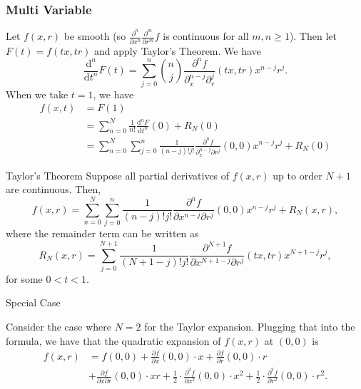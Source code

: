 \documentclass[class=article, crop=false]{standalone}
\begin{document}
  \subsubsection{Multi Variable}
  Let $f(x, r)$ be smooth (so $\displaystyle\frac{\partial^n}{\partial x^n} \frac{\partial^m}{\partial r^m}f$ is continuous for all $m, n \geq 1$). Then let $F(t) = f(tx, tr)$ and apply Taylor's Theorem. We have
  \[
    \frac{\mathrm{d}^n}{\mathrm{d}t^n} F(t) = \sum_{j=0}^{n} \binom{n}{j} \frac{\partial^nf}{\partial_x^{n - j}\partial_r^j}(tx, tr)x^{n - j}r^j.
  \]
  When we take $t = 1$, we have
  \begin{align*}
    f(x, t) &= F(1) \\
            &= \sum_{n=0}^{N} \frac{1}{n!} \frac{\mathrm{d}^nF}{\mathrm{d}t^n}(0) + R_N(0) \\
            &= \sum_{n=0}^{N} \sum_{j=0}^{n} \frac{1}{(n - j)!j!} \frac{\partial^nf}{\partial_x^{n - j}\partial r^j}(0, 0)x^{n - j}r^j + R_N(0)
  \end{align*}
  \begin{theorem}{Taylor's Theorem}
    Suppose all partial derivatives of $f(x, r)$ up to order $N + 1$ are continuous. Then,
    \[
      f(x, r) = \sum_{n=0}^{N} \sum_{j=0}^{n} \frac{1}{(n - j)!j!} \frac{\partial^nf}{\partial x^{n - j}\partial r^j}(0, 0) x^{n - j}r^j + R_N(x, r),
    \]
    where the remainder term can be written as
    \[
      R_N(x, r) = \sum_{j=0}^{N + 1} \frac{1}{(N + 1 - j)!j!} \frac{\partial^{N + 1}f}{\partial x^{N + 1 - j}\partial r^j}(tx, tr) x^{N + 1 - j}r^j,
    \]
    for some $0 < t < 1$.
  \end{theorem}
  \begin{example}{Special Case} \par
    Consider the case where $N = 2$ for the Taylor expansion. Plugging that into the formula, we have that the quadratic expansion of $f(x, r)$ at $(0, 0)$ is
    \begin{align*}
      f(x, r) &= f(0, 0) + \frac{\partial f}{\partial x}(0, 0)\cdot x + \frac{\partial f}{\partial r}(0, 0)\cdot r \\
              &+ \frac{\partial f}{\partial x\partial r}(0, 0)\cdot xr + \frac{1}{2}\cdot \frac{\partial^2 f}{\partial x^2}(0, 0)\cdot x^2 + \frac{1}{2}\cdot \frac{\partial^2 f}{\partial r^2}(0, 0)\cdot r^2.
    \end{align*}
  \end{example}
\end{document}
